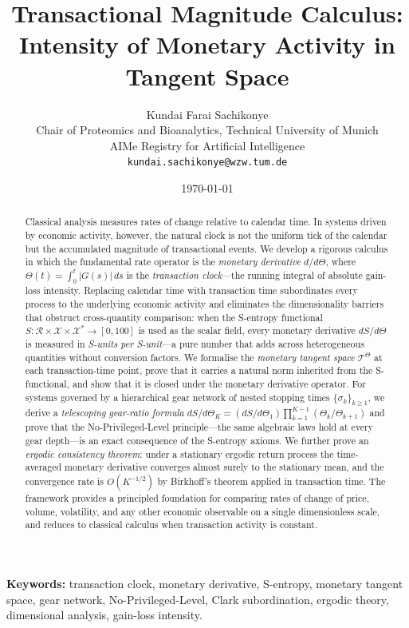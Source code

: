 \documentclass[twocolumn,11pt,a4paper]{article}
\title{\Large\textbf{Transactional Magnitude Calculus:\\
Intensity of Monetary Activity in Tangent Space}}
\author{Kundai Farai Sachikonye\\
\small Chair of Proteomics and Bioanalytics, Technical University of Munich\\
\small AIMe Registry for Artificial Intelligence\\
\small \texttt{kundai.sachikonye@wzw.tum.de}}
\date{\today}
\theoremstyle{thmstyle}
\theoremstyle{definition}
\theoremstyle{remark}
\newcommand{\Gain}{G}                        %
\newcommand{\Clock}{\Theta}                  %
\newcommand{\Sval}{S}                        %
\newcommand{\Mtan}{\mathcal{T}^{\Clock}}     %
\newcommand{\Receiver}{\mathcal{R}}
\begin{document}
\maketitle

\begin{abstract}
Classical analysis measures rates of change relative to
calendar time.  In systems driven by economic activity,
however, the natural clock is not the uniform tick of the
calendar but the accumulated magnitude of transactional
events.  We develop a rigorous calculus in which the
fundamental rate operator is the \emph{monetary derivative}
$d/d\Clock$, where $\Clock(t) = \int_{0}^{t}|\Gain(s)|\,ds$
is the \emph{transaction clock}---the running integral of
absolute gain-loss intensity.  Replacing calendar time with
transaction time subordinates every process to the
underlying economic activity and eliminates the
dimensionality barriers that obstruct cross-quantity
comparison: when the S-entropy functional
$\Sval:\Receiver\times\mathcal{X}\times\mathcal{X}^{*}
\to[0,100]$ is used as the scalar field, every monetary
derivative $d\Sval/d\Clock$ is measured in
\emph{S-units per S-unit}---a pure number that adds
across heterogeneous quantities without conversion factors.
We formalise the \emph{monetary tangent space} $\Mtan$ at
each transaction-time point, prove that it carries a natural
norm inherited from the S-functional, and show that it is
closed under the monetary derivative operator.  For systems
governed by a hierarchical gear network of nested stopping
times $\{\sigma_{k}\}_{k\geq 1}$, we derive a
\emph{telescoping gear-ratio formula}
$d\Sval/d\Clock_{K} = (d\Sval/d\Clock_{1})
\prod_{k=1}^{K-1}(\Clock_{k}/\Clock_{k+1})$
and prove that the No-Privileged-Level principle---the same
algebraic laws hold at every gear depth---is an exact
consequence of the S-entropy axioms.  We further prove an
\emph{ergodic consistency theorem}: under a stationary
ergodic return process the time-averaged monetary
derivative converges almost surely to the stationary
mean, and the convergence rate is $O(K^{-1/2})$ by
Birkhoff's theorem applied in transaction time.  The
framework provides a principled foundation for comparing
rates of change of price, volume, volatility, and any
other economic observable on a single dimensionless scale,
and reduces to classical calculus when transaction activity
is constant.
\end{abstract}

\noindent\textbf{Keywords:} transaction clock, monetary
derivative, S-entropy, monetary tangent space, gear network,
No-Privileged-Level, Clark subordination, ergodic theory,
dimensional analysis, gain-loss intensity.
\end{document}
